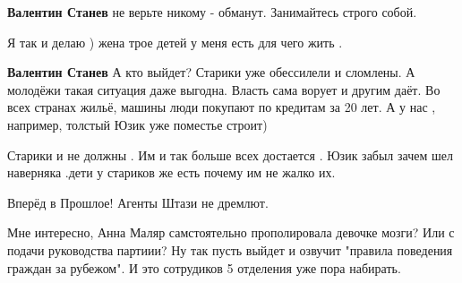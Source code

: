 \begin{itemize}
\begin{itemize}
\textbf{Валентин Станев} не верьте никому - обманут. Занимайтесь строго собой.

 
Я так и делаю ) жена трое детей у меня есть для чего жить .

 
\textbf{Валентин Станев} А кто выйдет? Старики уже обессилели и сломлены. А молодёжи такая ситуация даже выгодна. Власть сама ворует и другим даёт. Во всех странах жильё, машины люди покупают по кредитам за 20 лет. А у нас , например, толстый Юзик уже поместье строит)

 
Старики и не должны . Им и так больше всех достается . Юзик забыл зачем шел наверняка .дети у стариков же есть почему им не жалко их.
\end{itemize}

 
Вперёд в Прошлое!
Агенты Штази не дремлют.

 

Мне интересно, Анна Маляр самстоятельно прополировала девочке мозги? Или с
подачи руководства партиии? Ну так пусть выйдет и озвучит "правила поведения
граждан за рубежом". И это сотрудиков 5 отделения уже пора набирать.


\end{itemize}

